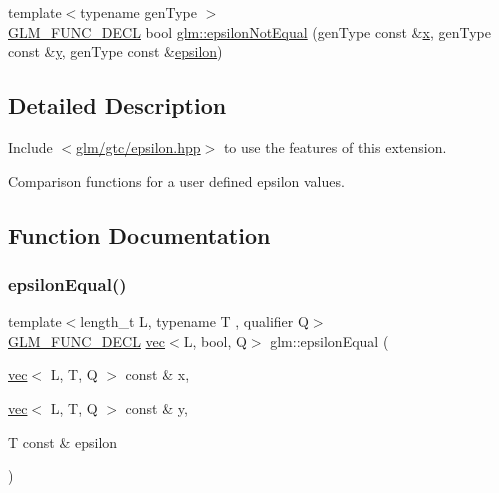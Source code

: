 \begin{DoxyCompactItemize}
\item 
{\footnotesize template$<$typename gen\+Type $>$ }\\\mbox{\hyperlink{setup_8hpp_ab2d052de21a70539923e9bcbf6e83a51}{G\+L\+M\+\_\+\+F\+U\+N\+C\+\_\+\+D\+E\+CL}} bool \mbox{\hyperlink{group__gtc__epsilon_ga50a92103fb0cbd796908e1bf20c79aaf}{glm\+::epsilon\+Not\+Equal}} (gen\+Type const \&\mbox{\hyperlink{_s_d_l__opengl_8h_ad0e63d0edcdbd3d79554076bf309fd47}{x}}, gen\+Type const \&\mbox{\hyperlink{_s_d_l__opengl_8h_a1675d9d7bb68e1657ff028643b4037e3}{y}}, gen\+Type const \&\mbox{\hyperlink{group__gtc__constants_ga2a1e57fc5592b69cfae84174cbfc9429}{epsilon}})
\end{DoxyCompactItemize}


\subsection{Detailed Description}
Include $<$\mbox{\hyperlink{epsilon_8hpp}{glm/gtc/epsilon.\+hpp}}$>$ to use the features of this extension.

Comparison functions for a user defined epsilon values. 

\subsection{Function Documentation}
\mbox{\label{group__gtc__epsilon_ga91b417866cafadd076004778217a1844}} 
\subsubsection{\texorpdfstring{epsilon\+Equal()}{epsilonEqual()}\hspace{0.1cm}{\footnotesize\ttfamily [1/2]}}
{\footnotesize\ttfamily template$<$length\+\_\+t L, typename T , qualifier Q$>$ \\
\mbox{\hyperlink{setup_8hpp_ab2d052de21a70539923e9bcbf6e83a51}{G\+L\+M\+\_\+\+F\+U\+N\+C\+\_\+\+D\+E\+CL}} \mbox{\hyperlink{structglm_1_1vec}{vec}}$<$L, bool, Q$>$ glm\+::epsilon\+Equal (\begin{DoxyParamCaption}\item[{\mbox{\hyperlink{structglm_1_1vec}{vec}}$<$ L, T, Q $>$ const \&}]{x,  }\item[{\mbox{\hyperlink{structglm_1_1vec}{vec}}$<$ L, T, Q $>$ const \&}]{y,  }\item[{T const \&}]{epsilon }\end{DoxyParamCaption})}

